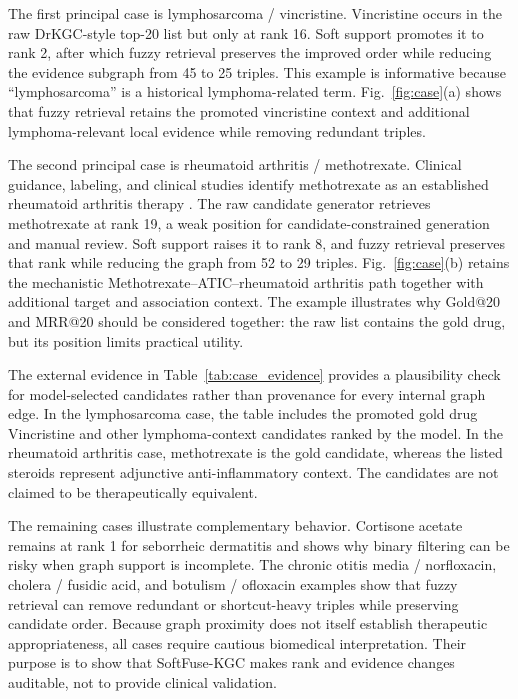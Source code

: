 \documentclass[pdflatex,sn-mathphys-num]{sn-jnl}
\newcommand{\figref}[1]{Fig.~\ref{#1}}
\newcommand{\tabref}[1]{Table~\ref{#1}}
\newcommand{\softfuse}{SoftFuse-KGC}
\newcommand{\drkgc}{DrKGC}
\begin{document}
The first principal case is lymphosarcoma / vincristine. Vincristine occurs in the raw \drkgc{}-style top-20 list but only at rank 16. Soft support promotes it to rank 2, after which fuzzy retrieval preserves the improved order while reducing the evidence subgraph from 45 to 25 triples. This example is informative because ``lymphosarcoma'' is a historical lymphoma-related term. \figref{fig:case}(a) shows that fuzzy retrieval retains the promoted vincristine context and additional lymphoma-relevant local evidence while removing redundant triples.

The second principal case is rheumatoid arthritis / methotrexate. Clinical guidance, labeling, and clinical studies identify methotrexate as an established rheumatoid arthritis therapy \citep{fraenkel20212021,weinblatt1994methotrexate,van2007efficacy}. The raw candidate generator retrieves methotrexate at rank 19, a weak position for candidate-constrained generation and manual review. Soft support raises it to rank 8, and fuzzy retrieval preserves that rank while reducing the graph from 52 to 29 triples. \figref{fig:case}(b) retains the mechanistic Methotrexate--ATIC--rheumatoid arthritis path together with additional target and association context. The example illustrates why Gold@20 and MRR@20 should be considered together: the raw list contains the gold drug, but its position limits practical utility.

The external evidence in \tabref{tab:case_evidence} provides a plausibility check for model-selected candidates rather than provenance for every internal graph edge. In the lymphosarcoma case, the table includes the promoted gold drug Vincristine and other lymphoma-context candidates ranked by the model. In the rheumatoid arthritis case, methotrexate is the gold candidate, whereas the listed steroids represent adjunctive anti-inflammatory context. The candidates are not claimed to be therapeutically equivalent.

The remaining cases illustrate complementary behavior. Cortisone acetate remains at rank 1 for seborrheic dermatitis and shows why binary filtering can be risky when graph support is incomplete. The chronic otitis media / norfloxacin, cholera / fusidic acid, and botulism / ofloxacin examples show that fuzzy retrieval can remove redundant or shortcut-heavy triples while preserving candidate order. Because graph proximity does not itself establish therapeutic appropriateness, all cases require cautious biomedical interpretation. Their purpose is to show that \softfuse{} makes rank and evidence changes auditable, not to provide clinical validation.
\end{document}
